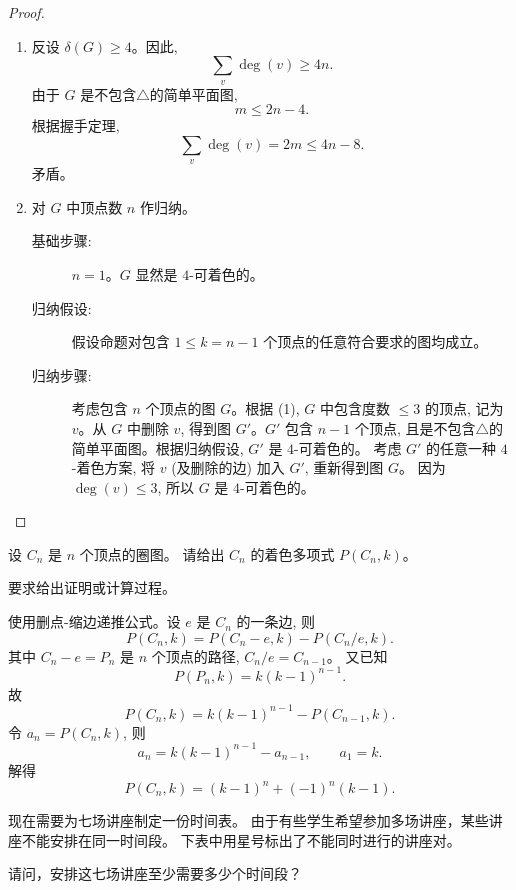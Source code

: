 \documentclass[a4paper, justified]{tufte-handout}
\begin{document}
\begin{proof}
  \begin{enumerate}[(1)]
    \item 反设 $\delta(G) \ge 4$。因此,
      \[
        \sum_{v} \deg(v) \ge 4n.
      \]
      由于 $G$ 是不包含$\triangle$的简单平面图,
      \[
        m \le 2n - 4.
      \]
      根据握手定理,
      \[
        \sum_{v} \deg(v) = 2m \le 4n - 8.
      \]
      矛盾。
    \item 对 $G$ 中顶点数 $n$ 作归纳。
      \begin{description}
        \item[基础步骤:] $n = 1$。$G$ 显然是 $4$-可着色的。
        \item[归纳假设:] 假设命题对包含 $1 \le k = n-1$ 个顶点的任意符合要求的图均成立。
        \item[归纳步骤:] 考虑包含 $n$ 个顶点的图 $G$。根据 (1), $G$ 中包含度数 $\le 3$
          的顶点, 记为 $v$。从 $G$ 中删除 $v$, 得到图 $G'$。$G'$ 包含 $n-1$ 个顶点,
          且是不包含$\triangle$的简单平面图。根据归纳假设, $G'$ 是 $4$-可着色的。
          考虑 $G'$ 的任意一种 $4$-着色方案, 将 $v$ (及删除的边) 加入 $G'$, 重新得到图 $G$。
          因为 $\deg(v) \le 3$, 所以 $G$ 是 $4$-可着色的。
      \end{description}
  \end{enumerate}
\end{proof}

\begin{problem}[着色多项式]
  设 $C_{n}$ 是 $n$ 个顶点的圈图。
  请给出 $C_{n}$ 的着色多项式 $P(C_{n}, k)$。

  \noindent 要求给出证明或计算过程。
\end{problem}

\begin{solution}
  使用删点-缩边递推公式。设 $e$ 是 $C_n$ 的一条边, 则
  \[
    P(C_n, k) = P(C_n - e, k) - P(C_n / e, k).
  \]
  其中 $C_n - e = P_n$ 是 $n$ 个顶点的路径, $C_n / e = C_{n-1}$。
  又已知
  \[
    P(P_n, k) = k(k-1)^{n-1}.
  \]
  故
  \[
    P(C_n, k) = k(k-1)^{n-1} - P(C_{n-1}, k).
  \]
  令 $a_n = P(C_n,k)$, 则
  \[
    a_n = k(k-1)^{n-1} - a_{n-1},
    \qquad
    a_1 = k.
  \]
  解得
  \[
    P(C_n, k) = (k-1)^n + (-1)^n (k-1).
  \]
\end{solution}

\begin{problem}[图着色的应用]
  现在需要为七场讲座制定一份时间表。
  由于有些学生希望参加多场讲座，某些讲座不能安排在同一时间段。
  下表中用星号标出了不能同时进行的讲座对。

  \noindent 请问，安排这七场讲座至少需要多少个时间段？
\end{problem}
\end{document}
